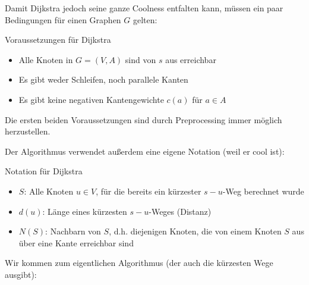 \documentclass{panikzettel}
\newcommand{\boxspace}{	\vspace{-\baselineskip}	}
\begin{document}
\begin{halfboxl}
	\boxspace
Damit Dijkstra jedoch seine ganze Coolness entfalten kann, müssen ein paar Bedingungen für einen Graphen $G$ gelten:

\begin{theo}{Voraussetzungen für Dijkstra}
\begin{itemize}
	\item Alle Knoten in $G = (V,A)$ sind von $s$ aus erreichbar
	\item Es gibt weder Schleifen, noch parallele Kanten
	\item Es gibt keine negativen Kantengewichte $c(a)$ für $a \in A$
\end{itemize}

Die ersten beiden Voraussetzungen sind durch Preprocessing immer möglich herzustellen.

\end{theo}

\end{halfboxl}%
\begin{halfboxr}
	\boxspace
Der Algorithmus verwendet außerdem eine eigene Notation (weil er cool ist):

	\vspace{\baselineskip}
\begin{defi}{Notation für Dijkstra}
	\begin{itemize}
		\item $S$: Alle Knoten $u \in V$, für die bereits ein kürzester $s-u$-Weg berechnet wurde
		\item $d(u)$: Länge eines kürzesten $s-u$-Weges (Distanz)
		\item $N(S)$: Nachbarn von $S$, d.h. diejenigen Knoten, die von einem Knoten $S$ aus über eine Kante erreichbar sind
	\end{itemize}
\end{defi}
\end{halfboxr}

Wir kommen zum eigentlichen Algorithmus (der auch die kürzesten Wege ausgibt):
\end{document}
